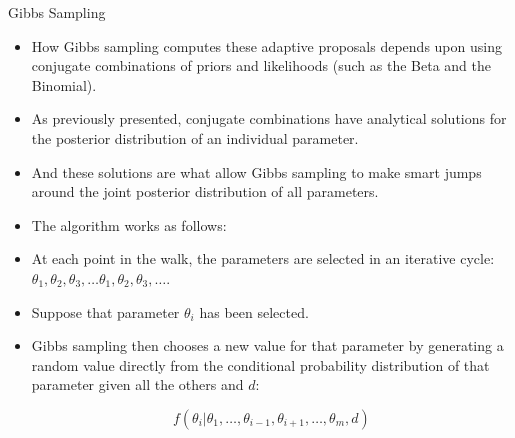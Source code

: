 \documentclass[handout]{beamer}
\begin{document}
\begin{frame}{Gibbs Sampling}
\scriptsize{

\begin{itemize}

\item How Gibbs sampling computes these adaptive proposals depends upon using conjugate combinations of priors and likelihoods (such as the Beta and the Binomial). 

\item As previously presented, conjugate combinations have analytical solutions for the posterior distribution of an individual parameter. 

\item And these solutions are what allow Gibbs sampling to make smart jumps around the joint posterior distribution of all parameters.

\item The algorithm works as follows:

\item At each point in the walk, the parameters are selected in an iterative cycle: $\theta_1, \theta_2, \theta_3 , \dots \theta_1, \theta_2, \theta_3, \dots.$ 

\item Suppose that parameter $\theta_i$ has been selected.

\item Gibbs sampling then chooses a new value for that parameter by generating a random value directly from
the conditional probability distribution of that parameter given all the others and $d$: 

\begin{displaymath}
f(\theta_i | \theta_1,\dots, \theta_{i-1}, \theta_{i+1}, \dots,\theta_m,d)  
\end{displaymath}





\end{itemize}


} 
\end{frame}
\end{document}
